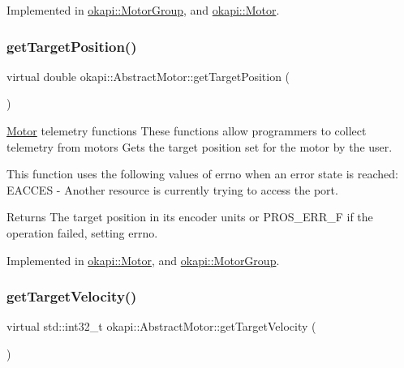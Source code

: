 Implemented in \mbox{\hyperlink{classokapi_1_1MotorGroup_ac7d9b049f24ddc141b2b63f7e3e4d3ba}{okapi\+::\+Motor\+Group}}, and \mbox{\hyperlink{classokapi_1_1Motor_a74c579c35863bc5180c9551fd5185d94}{okapi\+::\+Motor}}.

\mbox{\label{classokapi_1_1AbstractMotor_a144377e461ec5801289c37bab5132cce}} 
\subsubsection{\texorpdfstring{getTargetPosition()}{getTargetPosition()}}
{\footnotesize\ttfamily virtual double okapi\+::\+Abstract\+Motor\+::get\+Target\+Position (\begin{DoxyParamCaption}{ }\end{DoxyParamCaption})\hspace{0.3cm}{\ttfamily [pure virtual]}}

\mbox{\hyperlink{classokapi_1_1Motor}{Motor}} telemetry functions These functions allow programmers to collect telemetry from motors Gets the target position set for the motor by the user.

This function uses the following values of errno when an error state is reached\+: E\+A\+C\+C\+ES -\/ Another resource is currently trying to access the port.

\begin{DoxyReturn}{Returns}
The target position in its encoder units or P\+R\+O\+S\+\_\+\+E\+R\+R\+\_\+F if the operation failed, setting errno. 
\end{DoxyReturn}


Implemented in \mbox{\hyperlink{classokapi_1_1Motor_af575af2b4d4cf5aea6e8aac50ef1cbbd}{okapi\+::\+Motor}}, and \mbox{\hyperlink{classokapi_1_1MotorGroup_ad6332111f8b2642bc13fbd8822328121}{okapi\+::\+Motor\+Group}}.

\mbox{\label{classokapi_1_1AbstractMotor_a96b02cca7b51f75c01d2d22aab474fe4}} 
\subsubsection{\texorpdfstring{getTargetVelocity()}{getTargetVelocity()}}
{\footnotesize\ttfamily virtual std\+::int32\+\_\+t okapi\+::\+Abstract\+Motor\+::get\+Target\+Velocity (\begin{DoxyParamCaption}{ }\end{DoxyParamCaption})\hspace{0.3cm}{\ttfamily [pure virtual]}}

